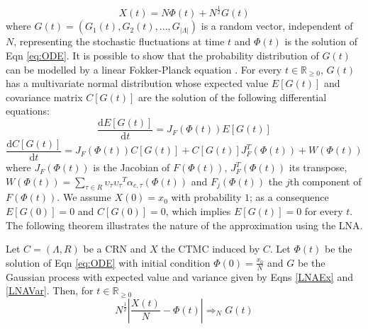 \documentclass{llncs}
\begin{document}
\begin{equation}
	 X(t) = N\Phi(t) + N^{\frac{1}{2}}G(t)
\label{eq:hypothsis}
\end{equation}
 where $G(t)=(G_1(t),G_2(t),...,G_{|\Lambda|})$ is a random vector, independent of $N$, representing the stochastic fluctuations at time $t$ and $\Phi(t)$ is the solution of Eqn \eqref{eq:ODE}.
It is possible to show that the probability distribution of $G(t)$ can be modelled by a linear Fokker-Planck equation \cite{Wallace2012}. For every $t \in \mathbb{R}_{\geq0}$, $G(t)$ has a multivariate normal distribution whose expected value $E[G(t)]$ and covariance matrix $C[G(t)]$ are the solution of the following differential equations:
\begin{equation}
		\frac{\mathrm d E[G(t)]}{\mathrm d t}  = J_F(\Phi(t))E[G(t)]
\label{LNAEx}
\end{equation}
\begin{equation}
		\frac{\mathrm d C[G(t)] }{\mathrm d t}  = J_F(\Phi(t))C[G(t)] + C[G(t)]J^T_F(\Phi(t))+W(\Phi(t))
\label{LNAVar}
\end{equation}
where ${J}_F(\Phi(t))$ is the Jacobian of $F(\Phi(t))$, $J^T_F(\Phi(t))$ its transpose, $ W(\Phi(t))= \sum_{\tau \in R} \upsilon_{\tau} {\upsilon_{\tau}}^T \alpha_{c,\tau}(\Phi(t)) $ and $F_j(\Phi(t))$ the $j$th component of $F(\Phi(t))$. We assume $X(0)=x_0$ with probability $1$; as a consequence $E[G(0)]=0$ and $C[G(0)]=0$, which implies $E[G(t)]=0$ for every $t$.
The following theorem %
illustrates the nature of the approximation using the LNA.
\begin{theorem}{\cite{ethier2009markov}}\label{LNA-th}
Let $C=(\Lambda,R)$ be a CRN and $X$ the CTMC induced by $C$. Let $\Phi(t)$ be the solution of Eqn \eqref{eq:ODE}
with initial condition $\Phi(0)=\frac{x_0}{N}$ and $G$ be the Gaussian process with expected value and variance given by Eqns \eqref{LNAEx} and \eqref{LNAVar}. Then, for $t\in \mathbb{R}_{\geq 0}$
\[ N^{\frac{1}{2}}|\frac{X(t)}{N}-\Phi(t)| \Rightarrow_N G(t)\]
\end{theorem}
\end{document}
